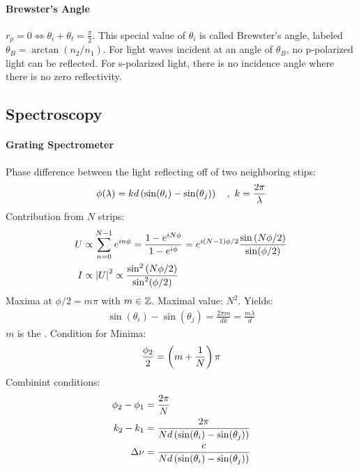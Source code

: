 \paragraph{Brewster's Angle}

$r_p = 0 \Leftrightarrow \theta_i + \theta_t = \frac{\pi}{2}$. This special value
of $\theta_i$ is called Brewster's angle, labeled $\theta_B = \arctan(n_2/n_1)$.
For light waves incident at an angle of $\theta_B$, no p-polarized light can be
reflected. For s-polarized light, there is no incidence angle where there is no
zero reflectivity.


\subsection{Spectroscopy}

\paragraph{Grating Spectrometer}
Phase difference between the light reflecting off of two neighboring stips:
\begin{align*}
    \phi(\lambda) = k d \left( \sin(\theta_i) - \sin(\theta_j) \right)
    \hspace{10pt} , \ k = \frac{2 \pi}{\lambda}
\end{align*}
Contribution from $N$ strips:
\begin{align*}
    U &\propto \sum_{n=0}^{N-1} e^{i n \phi} = \frac{1 - e^{i N \phi}}{1 - e^{i \phi}}
    = e^{i(N-1)\phi/2} \frac{\sin\left( N \phi / 2 \right)}{\sin(\phi/2)}
    \\
    I &\propto \left\vert U \right\vert^2 \propto \frac{\sin^2 \left( N \phi / 2 \right)}{\sin^2(\phi/2)}
\end{align*}
Maxima at $\phi/2 = m \pi$ with $m \in \mathbb{Z}$. Maximal value: $N^2$. Yields:
\begin{align*}
    \sin(\theta_i) - \sin(\theta_j) = \frac{2 \pi m}{d k} = \frac{m \lambda}{d}
\end{align*}
$m$ is the . Condition for Minima:
\begin{align*}
    \frac{\phi_2}{2} = \left( m + \frac{1}{N} \right) \pi
\end{align*}
Combinint conditions:
\begin{align*}
    \phi_2 - \phi_1 &= \frac{2 \pi}{N}
    \\
    k_2 - k_1 &= \frac{2 \pi}{N d \left( \sin(\theta_i) - \sin(\theta_j) \right)}
    \\
    \Delta \nu &= \frac{c}{N d \left( \sin(\theta_i) - \sin(\theta_j) \right)}
\end{align*}


